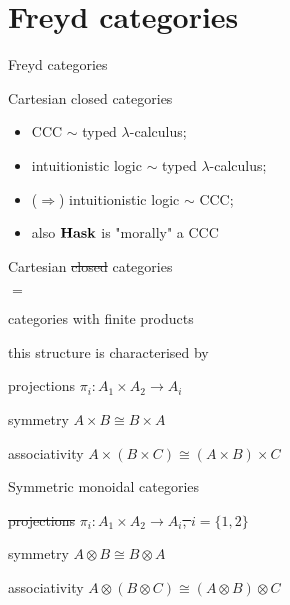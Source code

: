 \section{Freyd categories}

\begin{frame}
    \begin{center}\Huge Freyd categories\end{center}
\end{frame}

\begin{frame}

    {\huge \center Cartesian closed categories}
    \begin{itemize}
        \item CCC $\sim$ typed $\lambda$-calculus;
        \item intuitionistic logic $\sim$ typed $\lambda$-calculus;
        \item ($\Rightarrow$) intuitionistic logic $\sim$ CCC;
        \item also $\mathbf{Hask}$ is "morally" a CCC
    \end{itemize}
\end{frame}

\begin{frame}
    \begin{center}
    \huge
    Cartesian \sout{closed} categories

    $=$

    categories with finite products
    \end{center}

    this structure is characterised by

    \begin{itemeyez}
        \item[projections] $\pi_i: A_1 \times A_2 \to A_i$
        \item[symmetry] $A \times B \cong B \times A$
        \item[associativity] $A \times (B \times C) \cong (A \times B) \times C$
    \end{itemeyez}
\end{frame}


\begin{frame}
    \begin{center}\huge Symmetric monoidal categories\end{center}
    \begin{itemeyez}
        \item[\sout{projections}] \sout{$\pi_i: A_1 \times A_2 \to A_i$, $i = \{1, 2\}$}
        \item[symmetry] $A \otimes B \cong B \otimes A$
        \item[associativity] $A \otimes (B \otimes C) \cong (A \otimes B) \otimes C$
    \end{itemeyez}

\end{frame}


